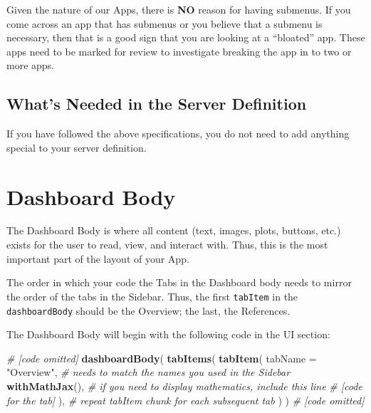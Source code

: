 \documentclass[
]{book}
\newenvironment{Shaded}{\begin{snugshade}}{\end{snugshade}}
\newcommand{\CommentTok}[1]{\textcolor[rgb]{0.56,0.35,0.01}{\textit{#1}}}
\newcommand{\DataTypeTok}[1]{\textcolor[rgb]{0.13,0.29,0.53}{#1}}
\newcommand{\KeywordTok}[1]{\textcolor[rgb]{0.13,0.29,0.53}{\textbf{#1}}}
\newcommand{\NormalTok}[1]{#1}
\newcommand{\StringTok}[1]{\textcolor[rgb]{0.31,0.60,0.02}{#1}}
\begin{document}
Given the nature of our Apps, there is \textbf{NO} reason for having submenus. If you come across an app that has submenus or you believe that a submenu is necessary, then that is a good sign that you are looking at a ``bloated'' app. These apps need to be marked for review to investigate breaking the app in to two or more apps.

\hypertarget{whats-needed-in-the-server-definition-5}{%
\subsection{What's Needed in the Server Definition}\label{whats-needed-in-the-server-definition-5}}

If you have followed the above specifications, you do not need to add anything special to your server definition.

\hypertarget{bodyb}{%
\section{Dashboard Body}\label{bodyb}}

The Dashboard Body is where all content (text, images, plots, buttons, etc.) exists for the user to read, view, and interact with. Thus, this is the most important part of the layout of your App.

The order in which your code the Tabs in the Dashboard body needs to mirror the order of the tabs in the Sidebar. Thus, the first \texttt{tabItem} in the \texttt{dashboardBody} should be the Overview; the last, the References.

The Dashboard Body will begin with the following code in the UI section:

\begin{Shaded}
\begin{Highlighting}[]
\CommentTok{# [code omitted]}
\KeywordTok{dashboardBody}\NormalTok{(}
  \KeywordTok{tabItems}\NormalTok{(}
    \KeywordTok{tabItem}\NormalTok{(}
      \DataTypeTok{tabName =} \StringTok{"Overview"}\NormalTok{, }\CommentTok{# needs to match the names you used in the Sidebar}
      \KeywordTok{withMathJax}\NormalTok{(), }\CommentTok{# if you need to display mathematics, include this line}
      \CommentTok{# [code for the tab]}
\NormalTok{    ),}
    \CommentTok{# repeat tabItem chunk for each subsequent tab}
\NormalTok{  )}
\NormalTok{)}
\CommentTok{# [code omitted]}
\end{Highlighting}
\end{Shaded}
\end{document}
